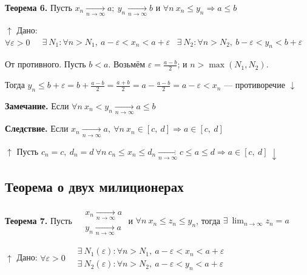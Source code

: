 \documentclass{article}
\begin{document}
    \textbf{Теорема 6.} Пусть \(x_n \xrightarrow[n \rightarrow \infty]{} a;\ y_n \xrightarrow[n \rightarrow \infty]{} b\) и \(\forall n\ x_n \leq y_n \Rightarrow a \leq b\)
    
    \(\uparrow\) Дано: \(\forall \varepsilon > 0\ \begin{aligned}
    	&\exists\ N_1 : \forall n > N_1,\ a - \varepsilon < x_n < a + \varepsilon
        &\exists\ N_2 : \forall n > N_2,\ b - \varepsilon < y_n < b + \varepsilon
        \end{aligned}\)
    
    От противного. Пусть \(b < a\). Возьмём \(\varepsilon = \frac{a-b}{2}\); и \(n > \max{(N_1, N_2)}\).
    
    Тогда \(y_n \leq b + \varepsilon = b + \frac{a-b}{2} = \frac{a + b}{2} = a - \frac{a-b}{2} = a - \varepsilon < x_n\) --- противоречие \(\downarrow\)
    
    \textbf{Замечание.} Если \(\forall n\ x_n < y_n \xrightarrow[n \rightarrow \infty]{} a \leq b\)
  
    \textbf{Следствие.} Если \(x_n \xrightarrow[n \rightarrow \infty]{} a,\ \forall n\ x_n \in [c,\ d] \Rightarrow a \in [c,\ d]\)
    
    \(\uparrow\) Пусть \(c_n = c,\ d_n = d\ \forall n\ c_n \leq x_n \leq d_n \xrightarrow[n \rightarrow \infty]{} c \leq a \leq d \Rightarrow a \in [c,\ d]\ \downarrow\)
    
    \subsection{Теорема о двух милиционерах}
    
    \textbf{Теорема 7.} Пусть \(\begin{aligned}
    	&x_n \xrightarrow[n \rightarrow \infty]{} a\\
        &y_n \xrightarrow[n \rightarrow \infty]{} a
        \end{aligned}\) и \(\forall n\ x_n \leq z_n \leq y_n\), тогда \(\exists\ \lim_{n \rightarrow \infty}{z_n} = a\)
        
    \(\uparrow\) Дано: \(\forall \varepsilon > 0\ \begin{aligned}
    	&\exists\ N_1(\varepsilon) : \forall n > N_1,\ a - \varepsilon < x_n < a + \varepsilon\\
        &\exists\ N_2(\varepsilon) : \forall n > N_2,\ a - \varepsilon < y_n < a + \varepsilon
    	\end{aligned}\)
    
\end{document}
